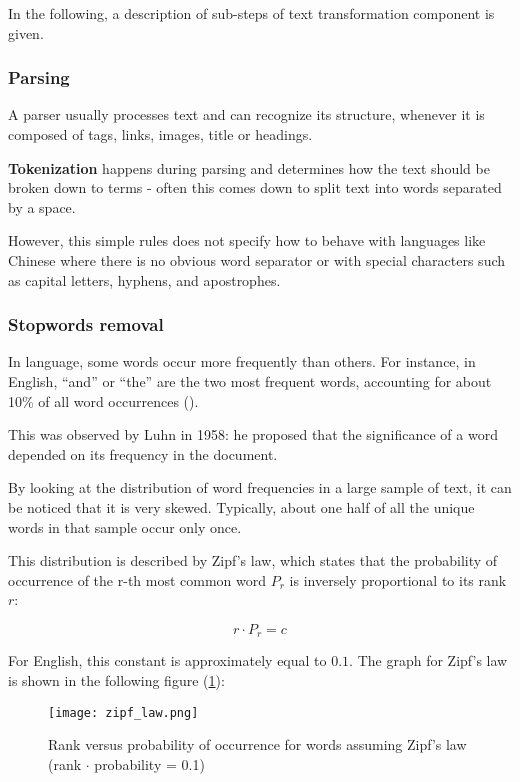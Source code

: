 In the following, a description of sub-steps of text transformation component is given.

\subsubsection{Parsing}

A parser usually processes text and can recognize its structure, whenever it is composed of tags, links, images, title or headings.

\textbf{Tokenization} happens during parsing and determines how the text should be broken down to terms - often this comes down to split text into words separated by a space.

However, this simple rules does not specify how to behave with languages like Chinese where there is no obvious word separator or with special characters such as capital letters, hyphens, and apostrophes.

\subsubsection{Stopwords removal}

In language, some words occur more frequently than others. For instance, in English, ``and'' or ``the'' are the two most frequent words, accounting for about 10\% of all word occurrences (\cite{croftIR}).

This was observed by Luhn in 1958: he proposed that the significance of a word depended on its frequency in the document.

By looking at the distribution of word frequencies in a large sample of text, it can be noticed that it is very skewed. Typically, about one half of all the unique words in that sample occur only once.

This distribution is described by Zipf's law, which states that the probability of occurrence of the r-th most common word $P_r$ is inversely proportional to its rank $r$:

\begin{equation}
\tag{Zipf's law}
    r \cdot P_r = c
\end{equation}

For English, this constant is approximately equal to $0.1$. The graph for Zipf's law is shown in the following figure (\ref{fig:ziplaw}):

\begin{figure}[H]
  \centering
    \texttt{[image: zipf\_law.png]}
  \caption{Rank versus probability of occurrence for words assuming Zipf's law (rank $\cdot$ probability = 0.1)}
  \label{fig:ziplaw}
\end{figure}

